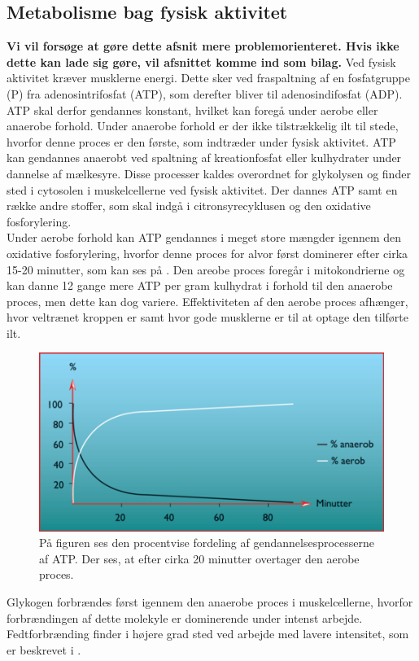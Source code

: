 \subsection{Metabolisme bag fysisk aktivitet}
\textbf{Vi vil forsøge at gøre dette afsnit mere problemorienteret. Hvis ikke dette kan lade sig gøre, vil afsnittet komme ind som bilag.}
Ved fysisk aktivitet kræver musklerne energi. Dette sker ved fraspaltning af en fosfatgruppe (P) fra adenosintrifosfat (ATP), som derefter bliver til adenosindifosfat (ADP). ATP skal derfor gendannes konstant, hvilket kan foregå under aerobe eller anaerobe forhold. Under anaerobe forhold er der ikke tilstrækkelig ilt til stede, hvorfor denne proces er den første, som indtræder under fysisk aktivitet. ATP kan gendannes anaerobt ved spaltning af kreationfosfat eller kulhydrater under dannelse af mælkesyre. Disse processer kaldes overordnet for glykolysen og finder sted i cytosolen i muskelcellerne ved fysisk aktivitet. Der dannes ATP samt en række andre stoffer, som skal indgå i citronsyrecyklusen og den oxidative fosforylering.\citep{Martini2012,Engelbreth2010} \\
Under aerobe forhold kan ATP gendannes i meget store mængder igennem den oxidative fosforylering, hvorfor denne proces for alvor først dominerer efter cirka 15-20 minutter, som kan ses på . Den areobe proces foregår i mitokondrierne og kan danne 12 gange mere ATP per gram kulhydrat i forhold til den anaerobe proces, men dette kan dog variere. Effektiviteten af den aerobe proces afhænger, hvor veltrænet kroppen er samt hvor gode musklerne er til at optage den tilførte ilt.\citep{Engelbreth2010,Martini2012,Stanfield2013} 
\begin{figure}[H]
	\centering
	\includegraphics[scale=0.65]{figures/aProblemanalyse/Metabolisme.png}
	\caption{På figuren ses den procentvise fordeling af gendannelsesprocesserne af ATP. Der ses, at efter cirka 20 minutter overtager den aerobe proces.\citep{Engelbreth2010}}
	\label{fig:Metabolisme}
\end{figure}
Glykogen forbrændes først igennem den anaerobe proces i muskelcellerne, hvorfor forbrændingen af dette molekyle er dominerende under intenst arbejde. Fedtforbrænding finder i højere grad sted ved arbejde med lavere intensitet, som er beskrevet i .\citep{Martini2012,Stanfield2013,Engelbreth2010}